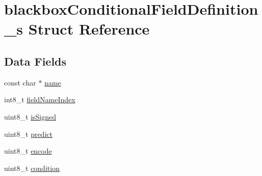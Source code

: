 \hypertarget{structblackboxConditionalFieldDefinition__s}{\section{blackbox\+Conditional\+Field\+Definition\+\_\+s Struct Reference}
\label{structblackboxConditionalFieldDefinition__s}
}
\subsection*{Data Fields}
\begin{DoxyCompactItemize}
\item 
const char $\ast$ \hyperlink{structblackboxConditionalFieldDefinition__s_a2aab63829ffa48767e0abed003258533}{name}
\item 
int8\+\_\+t \hyperlink{structblackboxConditionalFieldDefinition__s_a6864caa9e99b6bdc6c20fb441ef4e73a}{field\+Name\+Index}
\item 
uint8\+\_\+t \hyperlink{structblackboxConditionalFieldDefinition__s_a537fb8a3ebdfd4f4f75048becdda6b44}{is\+Signed}
\item 
uint8\+\_\+t \hyperlink{structblackboxConditionalFieldDefinition__s_a47755a7ce3662bea640ac36a0774edee}{predict}
\item 
uint8\+\_\+t \hyperlink{structblackboxConditionalFieldDefinition__s_a18cf678ba8fa1c5c69931e9dc05fbced}{encode}
\item 
uint8\+\_\+t \hyperlink{structblackboxConditionalFieldDefinition__s_ab26bb9afa8ddb64d71c8f9d699ef056a}{condition}
\end{DoxyCompactItemize}


